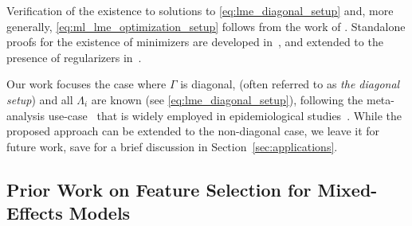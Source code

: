 Verification of the existence to solutions to \eqref{eq:lme_diagonal_setup}
and, more generally, \eqref{eq:ml_lme_optimization_setup} follows from the work of \cite{zheng2021trimmed}.
Standalone proofs for the existence of minimizers are developed in~\cite[Theorem 1]{Theory1},
and extended to the presence of regularizers in~\cite[Theorem 2]{Theory1}. %


%
%
%
%
% 
%


Our work focuses the case where $\Gamma$ is diagonal, 
  (often referred to as \textit{the diagonal setup}) 
 and all $\Lambda_i$ are known (see \eqref{eq:lme_diagonal_setup}), 
following the meta-analysis use-case~\citep{zheng2021trimmed} that is widely 
employed in epidemiological studies~\cite{murray2020global}. 
While the proposed approach can be extended to the non-diagonal case, we leave it for future work, save for a brief discussion in Section~\ref{sec:applications}.

\subsection{Prior Work on Feature Selection for Mixed-Effects Models}
\label{sec:prior_work}

